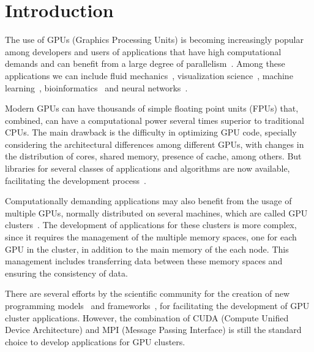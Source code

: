 \documentclass[journal]{IEEEtran}
\begin{document}
\section{Introduction}


The use of GPUs (Graphics Processing Units) is becoming increasingly popular
among developers and users of applications that have high computational demands
and can benefit from a large degree of parallelism~\cite{gpu2}. Among these
applications we can include fluid mechanics~\cite{fluid2}, visualization
science~\cite{visualization2}, machine learning~\cite{learning2},
bioinformatics~\cite{bioinformatica2} and neural networks~\cite{neural}.

Modern GPUs can have thousands of simple floating point units (FPUs) that,
combined, can have a computational power several times superior to traditional
CPUs. The main drawback is the difficulty in optimizing GPU code, specially
considering the architectural differences among different GPUs, with changes in
the distribution of cores, shared memory, presence of cache, among others. But
libraries for several classes of applications and algorithms are now available,
facilitating the development process~\cite{cuNN, cuMath}.


Computationally demanding applications may also benefit from the usage of
multiple GPUs, normally distributed on several machines, which are called GPU
clusters~\cite{raphael, cluster}. The development of applications for these
clusters is more complex, since it requires the management of the multiple
memory spaces, one for each GPU in the cluster, in addition to the main memory
of the each node. This management includes transferring data between these
memory spaces and ensuring the consistency of data. 

There are several efforts by the scientific community for the creation of new
programming models~\cite{appCientificas, wave} and frameworks~\cite{snucl, Flat,
  starpu}, for facilitating the development of GPU cluster
applications. However, the combination of CUDA (Compute Unified Device
Architecture) and MPI (Message Passing Interface) is still the standard choice
to develop applications for GPU clusters.
\end{document}
